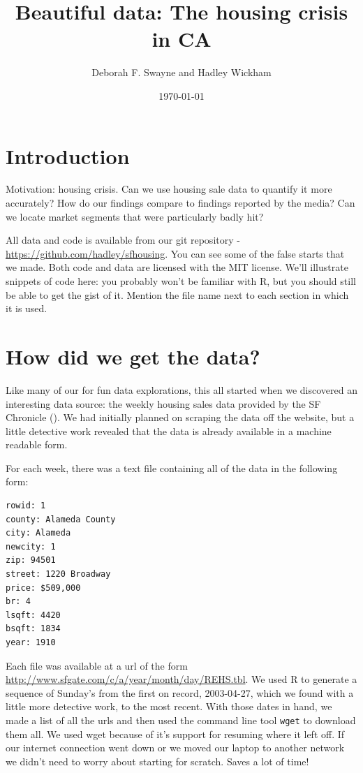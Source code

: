 \documentclass[oneside]{article}
\title{Beautiful data: The housing crisis in CA}
\author{Deborah F. Swayne and Hadley Wickham}
\date{\today}
\begin{document}
\maketitle 

\section{Introduction}

Motivation: housing crisis.  Can we use housing sale data to quantify it more accurately?  How do our findings compare to findings reported by the media?  Can we locate market segments that were particularly badly hit?

All data and code is available from our git repository - \url{https://github.com/hadley/sfhousing}.  You can see some of the false starts that we made.  Both code and data are licensed with the MIT license. We'll illustrate snippets of code here: you probably won't be familiar with R, but you should still be able to get the gist of it.  Mention the file name next to each section in which it is used.

\section{How did we get the data?}

Like many of our for fun data explorations, this all started when we discovered an interesting data source: the weekly housing sales data provided by the SF Chronicle (\url{}). We had initially planned on scraping the data off the website, but a little detective work revealed that the data is already available in a machine readable form. 

For each week, there was a text file containing all of the data in the following form:

\begin{verbatim}
rowid: 1
county: Alameda County
city: Alameda
newcity: 1
zip: 94501
street: 1220 Broadway
price: $509,000
br: 4
lsqft: 4420
bsqft: 1834
year: 1910
\end{verbatim}

Each file was available at a url of the form \url{http://www.sfgate.com/c/a/year/month/day/REHS.tbl}.  We used R to generate a sequence of Sunday's from the first on record, 2003-04-27, which we found with a little more detective work, to the most recent.  With those dates in hand, we made a list of all the urls and then used the command line tool {\tt wget} to download them all.   We used wget because of it's support for resuming where it left off.  If our internet connection went down or we moved our laptop to another network we didn't need to worry about starting for scratch.  Saves a lot of time!
\end{document}
